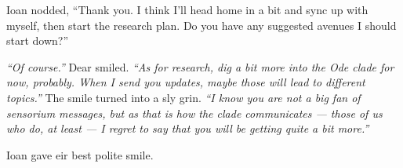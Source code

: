 Ioan nodded, ``Thank you. I think I'll head home in a bit and sync up with myself, then start the research plan. Do you have any suggested avenues I should start down?''

\emph{``Of course.''} Dear smiled. \emph{``As for research, dig a bit more into the Ode clade for now, probably. When I send you updates, maybe those will lead to different topics.''} The smile turned into a sly grin. \emph{``I know you are not a big fan of sensorium messages, but as that is how the clade communicates — those of us who do, at least — I regret to say that you will be getting quite a bit more.''}

Ioan gave eir best polite smile.
